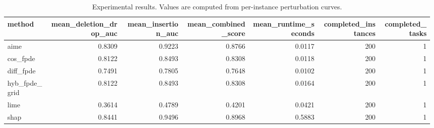 \begin{table}[t]
\caption{Experimental results. Values are computed from per-instance perturbation curves.}
\label{tab:main_results_computed}
\centering
\begin{tabular}{lrrrrrr}
\toprule
method & mean\_deletion\_drop\_auc & mean\_insertion\_auc & mean\_combined\_score & mean\_runtime\_seconds & completed\_instances & completed\_tasks \\
\midrule
aime & 0.8309 & 0.9223 & 0.8766 & 0.0117 & 200 & 1 \\
cos\_fpde & 0.8122 & 0.8493 & 0.8308 & 0.0118 & 200 & 1 \\
diff\_fpde & 0.7491 & 0.7805 & 0.7648 & 0.0102 & 200 & 1 \\
hyb\_fpde\_grid & 0.8122 & 0.8493 & 0.8308 & 0.0164 & 200 & 1 \\
lime & 0.3614 & 0.4789 & 0.4201 & 0.0421 & 200 & 1 \\
shap & 0.8441 & 0.9496 & 0.8968 & 0.5883 & 200 & 1 \\
\bottomrule
\end{tabular}

\end{table}
